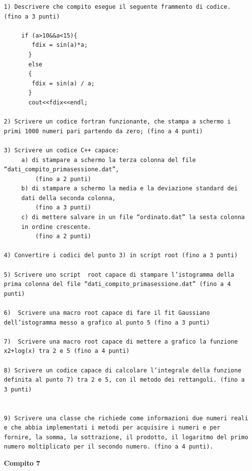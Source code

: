 \documentclass[11pt,fleqn]{book} %
\begin{document}
\begin{verbatim}
1) Descrivere che compito esegue il seguente frammento di codice. (fino a 3 punti)

     if (a>10&&a<15){
        fdix = sin(a)*a;
       }
       else
       {
        fdix = sin(a) / a;
       }
       cout<<fdix<<endl;

2) Scrivere un codice fortran funzionante, che stampa a schermo i 
primi 1000 numeri pari partendo da zero; (fino a 4 punti)

3) Scrivere un codice C++ capace:
     a) di stampare a schermo la terza colonna del file “dati_compito_primasessione.dat”, 
         (fino a 2 punti)
     b) di stampare a schermo la media e la deviazione standard dei 
     dati della seconda colonna,
         (fino a 3 punti)
     c) di mettere salvare in un file “ordinato.dat” la sesta colonna 
     in ordine crescente.
         (fino a 2 punti)

4) Convertire i codici del punto 3) in script root (fino a 3 punti)

5) Scrivere uno script  root capace di stampare l’istogramma della 
prima colonna del file “dati_compito_primasessione.dat” (fino a 4 
punti)

6)  Scrivere una macro root capace di fare il fit Gaussiano 
dell’istogramma messo a grafico al punto 5 (fino a 3 punti)

7)  Scrivere una macro root capace di mettere a grafico la funzione 
x2+log(x) tra 2 e 5 (fino a 4 punti)

8) Scrivere un codice capace di calcolare l’integrale della funzione 
definita al punto 7) tra 2 e 5, con il metodo dei rettangoli. (fino a 
3 punti)


9) Scrivere una classe che richiede come informazioni due numeri reali 
e che abbia implementati i metodi per acquisire i numeri e per 
fornire, la somma, la sottrazione, il prodotto, il logaritmo del primo 
numero moltiplicato per il secondo numero. (fino a 4 punti).
\end{verbatim}

\textbf{Compito 7}
\end{document}
